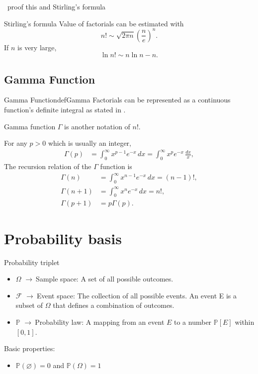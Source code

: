 \documentclass[11pt,a4paper,fleqn]{article}
\numberwithin{equation}{section}
\newcommand{\g}{$\rightarrow\ $}
\newcommand{\TODO}{\textcolor{ErrorRed}{\fbox{TODO}}\ }
\begin{document}
\TODO proof this and Stirling's formula

\begin{fact}{Stirling's formula}{}
    Value of factorials can be estimated with
    \begin{equation*}
        n!\sim \sqrt{2\pi n}\left(\frac{n}{e}\right)^n.
    \end{equation*}
    If $n$ is very large,
    \begin{equation*}
        \ln n! \sim n\ln n -n.
    \end{equation*}
\end{fact}

\subsection{Gamma Function}

\begin{fact}{Gamma Function}{defGamma}
    Factorials can be represented as a continuous function's definite integral as stated in .

    Gamma function $\Gamma$ is another notation of $n!$.

    For any $p>0$ which is usually an integer,
    \begin{align*}
        \Gamma(p)&=\int_{0}^{\infty}x^{p-1}e^{-x}\,dx = \int_{0}^{\infty} x^{p}e^{-x}\,\frac{dx}{x},
    \end{align*}
    The recursion relation of the $\Gamma$ function is
    \begin{align*}
        \Gamma(n)&=\int_{0}^{\infty}x^{n-1}e^{-x}\,dx=(n-1)!,\\
        \Gamma(n+1)&=\int_{0}^{\infty}x^{n}e^{-x}\,dx = n!,\\
        \Gamma(p+1)&=p\Gamma(p).
    \end{align*}
\end{fact}

\section{Probability basis}

\begin{fact}{Probability triplet}{}
    \begin{itemize}
        \item $\Omega$ \g Sample space: A set of all possible outcomes.
        \item $\mathcal{F}$ \g Event space: The collection of all  possible events. An event E is a subset of $\Omega$ that defines a combination of outcomes.
        \item $\mathbb{P}$ \g Probability law: A mapping from an event $E$ to a number $\mathbb{P}[E]$ within $[0,1]$.
    \end{itemize}
    Basic properties:
    \begin{itemize}
        \item $\mathbb{P}(\varnothing)=0$ and $\mathbb{P}(\Omega)=1$
    \end{itemize}
\end{fact}
\end{document}
